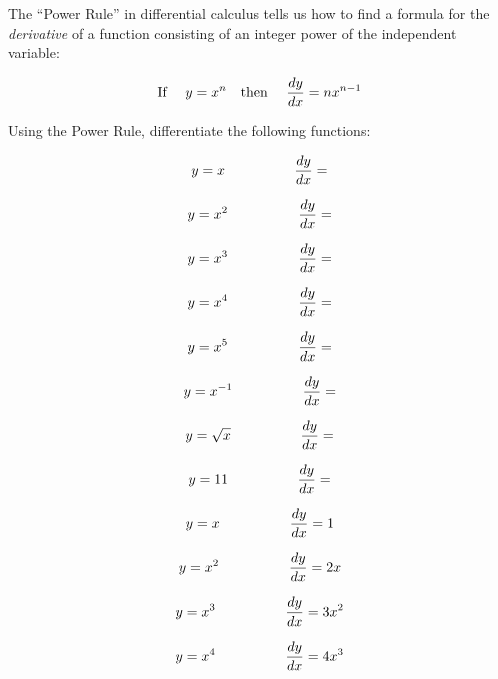 

The ``Power Rule'' in differential calculus tells us how to find a formula for the {\it derivative} of a function consisting of an integer power of the independent variable:

$$\hbox{If \hskip 10pt} y = x^n \hbox{\hskip 10pt then \hskip 10pt} {dy \over dx} = nx^{n-1}$$

\vskip 10pt

Using the Power Rule, differentiate the following functions:

\vskip 20pt

$$y = x \hbox{\hskip 50pt} {dy \over dx} = $$

\vskip 20pt

$$y = x^2 \hbox{\hskip 50pt} {dy \over dx} = $$

\vskip 20pt

$$y = x^3 \hbox{\hskip 50pt} {dy \over dx} = $$

\vskip 20pt

$$y = x^4 \hbox{\hskip 50pt} {dy \over dx} = $$

\vskip 20pt

$$y = x^5 \hbox{\hskip 50pt} {dy \over dx} = $$

\vskip 20pt

$$y = x^{-1} \hbox{\hskip 50pt} {dy \over dx} = $$

\vskip 20pt

$$y = \sqrt{x} \hbox{\hskip 50pt} {dy \over dx} = $$

\vskip 20pt

$$y = 11 \hbox{\hskip 50pt} {dy \over dx} = $$







$$y = x \hbox{\hskip 50pt} {dy \over dx} = 1$$

\vskip 20pt

$$y = x^2 \hbox{\hskip 50pt} {dy \over dx} = 2x$$

\vskip 20pt

$$y = x^3 \hbox{\hskip 50pt} {dy \over dx} = 3x^2$$

\vskip 20pt

$$y = x^4 \hbox{\hskip 50pt} {dy \over dx} = 4x^3$$

